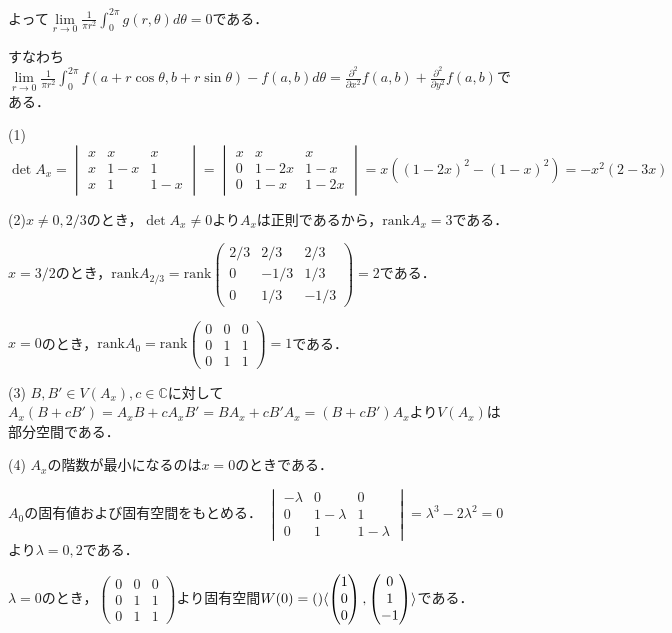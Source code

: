 \documentclass[
		book,
		head_space=20mm,
		foot_space=20mm,
		gutter=10mm,
		line_length=190mm
]{jlreq}
\begin{document}
よって$\lim\limits_{r\to 0}\frac{1}{\pi r^2} \int_0^{2\pi}g(r,\theta) d\theta = 0$である．

すなわち$\lim\limits_{r\to 0}\frac{1}{\pi r^2} \int_0^{2\pi} f(a+r\cos\theta,b+r\sin\theta)-f(a,b)d\theta = \frac{\partial^2}{\partial x^2}f(a,b) + \frac{\partial^2}{\partial y^2}f(a,b)$である．

(1) $\det A_x =\begin{vmatrix}
    x & x & x \\
    x & 1-x & 1 \\
    x & 1 & 1-x
\end{vmatrix}=\begin{vmatrix}
    x & x & x \\
    0 & 1-2x & 1-x \\
    0 & 1-x & 1-2x
\end{vmatrix}=x((1-2x)^2-(1-x)^2)=-x^2(2-3x)$

(2)$x\neq 0,2/3$のとき，$\det A_x\neq 0$より$A_x$は正則であるから，$ \mathrm{rank} A_x = 3$である．

$x=3/2$のとき，$\mathrm{rank} A_{2/3}=\mathrm{rank} \begin{pmatrix}
    2/3 & 2/3 & 2/3 \\
    0 & -1/3 & 1/3 \\
    0 & 1/3 & -1/3
\end{pmatrix} = 2$である．

$x=0$のとき，$\mathrm{rank} A_0=\mathrm{rank} \begin{pmatrix}
    0 & 0 & 0 \\
    0 & 1 & 1 \\
    0 & 1 & 1
\end{pmatrix} = 1$である．

(3) $B,B'\in V(A_x),c\in \mathbb{C}$に対して$A_x(B+cB')=A_xB+cA_xB'=BA_x+cB'A_x=(B+cB')A_x$より$V(A_x)$は部分空間である．

(4) $A_x$の階数が最小になるのは$x=0$のときである．

$A_0$の固有値および固有空間をもとめる．
$\begin{vmatrix}
    -\lambda & 0 & 0 \\
    0 & 1-\lambda & 1 \\
    0 & 1 & 1-\lambda
    \end{vmatrix}=\lambda^3-2\lambda^2=0$より$\lambda=0,2$である．

$\lambda=0$のとき，$\begin{pmatrix}
    0 & 0 & 0 \\
    0 & 1 & 1 \\
    0 & 1 & 1
    \end{pmatrix}$より固有空間$W(0)= \qty\langle \begin{pmatrix}
    1 \\
    0 \\
    0
    \end{pmatrix},\begin{pmatrix}
    0 \\
    1 \\
    -1
    \end{pmatrix} \rangle$である．
\end{document}
